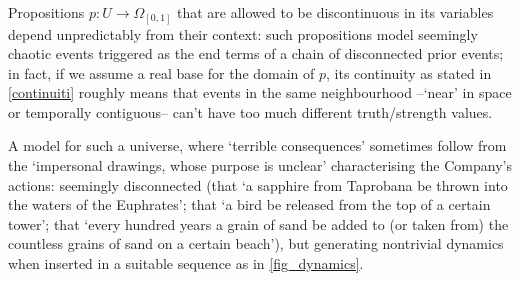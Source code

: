 \begin{example}\label{bli}
	Propositions $p : U \to \Omega_{[0,1]}$ that are allowed to be discontinuous in its variables depend unpredictably from their context: such propositions model seemingly chaotic events triggered as the end terms of a chain of disconnected prior events; in fact, if we assume a real base for the domain of $p$, its continuity as stated in \autoref{continuiti} roughly means that events in the same neighbourhood --`near' in space or temporally contiguous-- can't have too much different truth/strength values.

	A model for such a universe, where `terrible consequences' sometimes follow from the `impersonal drawings, whose purpose is unclear' characterising the Company's actions: seemingly disconnected (that `a sapphire from Taprobana be thrown into the waters of the Euphrates'; that `a bird be released from the top of a certain tower'; that `every hundred years a grain of sand be added to (or taken from) the countless grains of sand on a certain beach'), but generating nontrivial dynamics when inserted in a suitable sequence as in \autoref{fig_dynamics}.


\end{example}
